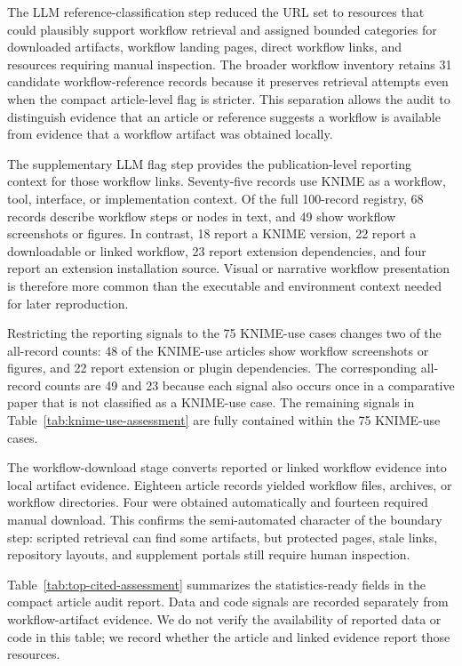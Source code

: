 \documentclass[runningheads]{llncs}
\begin{document}
The LLM reference-classification step reduced the URL set to resources that
could plausibly support workflow retrieval and assigned bounded categories for
downloaded artifacts, workflow landing pages, direct workflow links, and
resources requiring manual inspection. The broader workflow inventory retains
31 candidate workflow-reference records because it preserves retrieval
attempts even when the compact article-level flag is stricter. This separation
allows the audit to distinguish evidence that an article or reference suggests
a workflow is available from evidence that a workflow artifact was obtained
locally.

The supplementary LLM flag step provides the publication-level reporting
context for those workflow links. Seventy-five records use KNIME as a workflow,
tool, interface, or implementation context. Of the full 100-record registry, 68
records describe workflow steps or nodes in text, and 49 show workflow
screenshots or figures. In contrast, 18 report a KNIME version, 22 report a
downloadable or linked workflow, 23 report extension dependencies, and four
report an extension installation source. Visual or narrative workflow
presentation is therefore more common than the executable and environment
context needed for later reproduction.

Restricting the reporting signals to the 75 KNIME-use cases changes two of the
all-record counts: 48 of the KNIME-use articles show workflow screenshots or
figures, and 22 report extension or plugin dependencies. The corresponding
all-record counts are 49 and 23 because each signal also occurs once in a
comparative paper that is not classified as a KNIME-use case. The remaining
signals in Table~\ref{tab:knime-use-assessment} are fully contained within the
75 KNIME-use cases.

The workflow-download stage converts reported or linked workflow evidence into
local artifact evidence. Eighteen article records yielded workflow files,
archives, or workflow directories. Four were obtained automatically and
fourteen required manual download. This confirms the semi-automated character
of the boundary step: scripted retrieval can find some artifacts, but protected
pages, stale links, repository layouts, and supplement portals still require
human inspection.

Table~\ref{tab:top-cited-assessment} summarizes the statistics-ready fields in
the compact article audit report. Data and code signals are recorded separately
from workflow-artifact evidence. We do not verify the availability of reported
data or code in this table; we record whether the article and linked evidence
report those resources.
\end{document}
